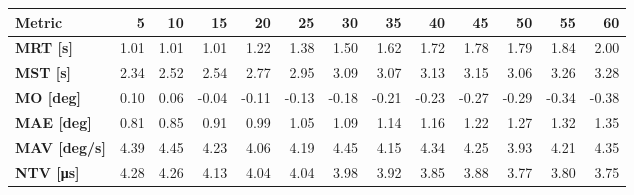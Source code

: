 \begin{tabular*}{\textwidth}{@{\extracolsep{\fill}}l|rrrrrrrrrrrr}
    \toprule
    \textbf{Metric} & \textbf{5} & \textbf{10} & \textbf{15} & \textbf{20} & \textbf{25} & \textbf{30} & \textbf{35} & \textbf{40} & \textbf{45} & \textbf{50} & \textbf{55} & \textbf{60} \\
    \midrule
    \textbf{MRT [s]} & 1.01 & 1.01 & 1.01 & 1.22 & 1.38 & 1.50 & 1.62 & 1.72 & 1.78 & 1.79 & 1.84 & 2.00 \\
    \textbf{MST [s]} & 2.34 & 2.52 & 2.54 & 2.77 & 2.95 & 3.09 & 3.07 & 3.13 & 3.15 & 3.06 & 3.26 & 3.28 \\
    \textbf{MO  [deg]} & 0.10 & 0.06 & -0.04 & -0.11 & -0.13 & -0.18 & -0.21 & -0.23 & -0.27 & -0.29 & -0.34 & -0.38 \\
    \textbf{MAE [deg]} & 0.81 & 0.85 & 0.91 & 0.99 & 1.05 & 1.09 & 1.14 & 1.16 & 1.22 & 1.27 & 1.32 & 1.35 \\
    \textbf{MAV [deg/s]} & 4.39 & 4.45 & 4.23 & 4.06 & 4.19 & 4.45 & 4.15 & 4.34 & 4.25 & 3.93 & 4.21 & 4.35 \\
    \textbf{NTV [\si{\micro\second}]} & 4.28 & 4.26 & 4.13 & 4.04 & 4.04 & 3.98 & 3.92 & 3.85 & 3.88 & 3.77 & 3.80 & 3.75 \\
    \bottomrule
\end{tabular*}

